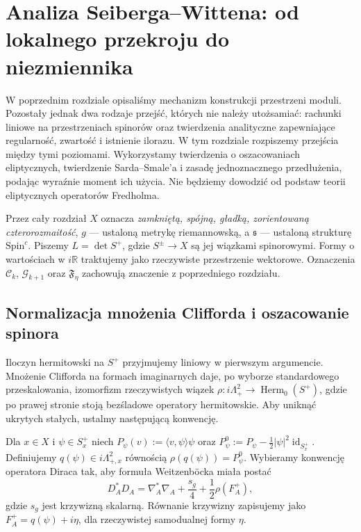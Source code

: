 \chapter{Analiza Seiberga--Wittena: od lokalnego przekroju do niezmiennika}
\label{ch:tg-sw-analiza-uzup}

W poprzednim rozdziale opisaliśmy mechanizm konstrukcji przestrzeni moduli.
Pozostały jednak dwa rodzaje przejść, których nie należy utożsamiać:
rachunki liniowe na przestrzeniach spinorów oraz twierdzenia analityczne
zapewniające regularność, zwartość i istnienie ilorazu. W tym rozdziale
rozpiszemy przejścia między tymi poziomami. Wykorzystamy twierdzenia
o oszacowaniach eliptycznych, twierdzenie Sarda--Smale'a i zasadę
jednoznacznego przedłużenia, podając wyraźnie moment ich użycia.
Nie będziemy dowodzić od podstaw teorii eliptycznych operatorów Fredholma.

Przez cały rozdział $X$ oznacza \emph{zamkniętą, spójną, gładką,
zorientowaną czterorozmaitość}, $g$ --- ustaloną metrykę riemannowską,
a $\mathfrak s$ --- ustaloną strukturę $\mathrm{Spin}^c$.
Piszemy $L=\det S^+$, gdzie $S^\pm\to X$ są jej wiązkami spinorowymi.
Formy o wartościach w $i\mathbb R$ traktujemy jako rzeczywiste
przestrzenie wektorowe. Oznaczenia $\mathcal C_k$, $\mathcal G_{k+1}$
oraz $\mathfrak F_\eta$ zachowują znaczenie z poprzedniego rozdziału.

\section{Normalizacja mnożenia Clifforda i oszacowanie spinora}
\label{sec:tg-sw12-clifford}

Iloczyn hermitowski na $S^+$ przyjmujemy liniowy w pierwszym
argumencie. Mnożenie Clifforda na formach imaginarnych daje, po
wyborze standardowego przeskalowania, izomorfizm rzeczywistych
wiązek $\rho\colon i\Lambda^2_+\longrightarrow
\operatorname{Herm}_0(S^+)$, gdzie po prawej stronie stoją
bezśladowe operatory hermitowskie. Aby uniknąć ukrytych stałych,
ustalmy następującą konwencję.

\begin{definicja}
\label{def:tg-sw12-q}
Dla $x\in X$ i $\psi\in S_x^+$ niech
$P_\psi(v):=\langle v,\psi\rangle\psi$ oraz
$P_\psi^0:=P_\psi-\tfrac12|\psi|^2\operatorname{id}_{S_x^+}$.
Definiujemy $q(\psi)\in i\Lambda^2_{+,x}$ równością
$\rho(q(\psi))=P_\psi^0$.
Wybieramy konwencję operatora Diraca tak, aby formuła
Weitzenböcka miała postać
\[
D_A^*D_A=\nabla_A^*\nabla_A+\frac{s_g}{4}
 +\frac12\rho(F_A^+),
\]
gdzie $s_g$ jest krzywizną skalarną. Równanie krzywizny
zapisujemy jako $F_A^+=q(\psi)+i\eta$, dla rzeczywistej
samodualnej formy $\eta$.
\end{definicja}

